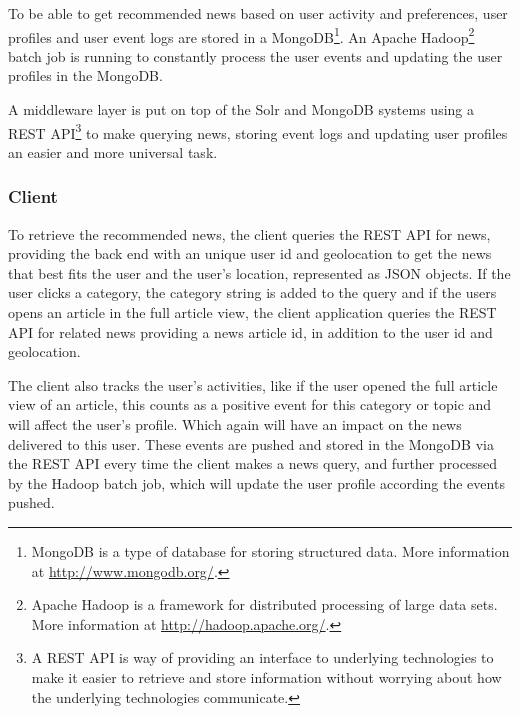 To be able to get recommended news based on user activity and preferences, user profiles and user event logs are stored in a MongoDB\footnote{MongoDB is a type of database for storing structured data. More information at \url{http://www.mongodb.org/}.}. An Apache Hadoop\footnote{Apache Hadoop is a framework for distributed processing of large data sets. More information at \url{http://hadoop.apache.org/}.} batch job is running to constantly process the user events and updating the user profiles in the MongoDB.

A middleware layer is put on top of the Solr and MongoDB systems using a REST API\footnote{A REST API is way of providing an interface to underlying technologies to make it easier to retrieve and store information without worrying about how the underlying technologies communicate.} to make querying news, storing event logs and updating user profiles an easier and more universal task.

\subsubsection{Client}
To retrieve the recommended news, the client queries the REST API for news, providing the back end with an unique user id and geolocation to get the news that best fits the user and the user's location, represented as JSON objects. If the user clicks a category, the category string is added to the query and if the users opens an article in the full article view, the client application queries the REST API for related news providing a news article id, in addition to the user id and geolocation.

The client also tracks the user's activities, like if the user opened the full article view of an article, this counts as a positive event for this category or topic and will affect the user's profile. Which again will have an impact on the news delivered to this user. These events are pushed and stored in the MongoDB via the REST API every time the client makes a news query, and further processed by the Hadoop batch job, which will update the user profile according the events pushed.

